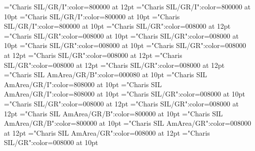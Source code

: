 \documentclass[a4paper,twoside]{article}
\begin{document}
\font\partofspeechmorphosyntaxanalysissensesensecontentsensesentryletDatadicBody="Charis SIL/GR/I":color=800000 at 12pt
\font\spanespartofspeechmorphosyntaxanalysissensesensecontentsensesentryletDatadicBody="Charis SIL/GR/I":color=800000 at 10pt
\font\spanspanespartofspeechmorphosyntaxanalysissensesensecontentsensesentryletDatadicBody="Charis SIL/GR/I":color=800000 at 10pt
\font\spanpartofspeechmorphosyntaxanalysissensesensecontentsensesentryletDatadicBody="Charis SIL/GR/I":color=800000 at 10pt
\font{}="Charis SIL/GR":color=008000 at 12pt
\font\spanesdefinitionsensesensecontentsensesentryletDatadicBody="Charis SIL/GR":color=008000 at 10pt
\font\spanspanesdefinitionsensesensecontentsensesentryletDatadicBody="Charis SIL/GR":color=008000 at 10pt
\font\spandefinitionsensesensecontentsensesentryletDatadicBody="Charis SIL/GR":color=008000 at 10pt
\font\pictureentryletDatadicBody="Charis SIL/GR":color=008000 at 12pt
\font\thumbnailpictureentryletDatadicBody="Charis SIL/GR":color=008000 at 12pt
\font\captionContentpictureentryletDatadicBody="Charis SIL/GR":color=008000 at 12pt
\font\captioncaptionContentpictureentryletDatadicBody="Charis SIL/GR":color=008000 at 12pt
\font\spanmxbcaptioncaptionContentpictureentryletDatadicBody="Charis SIL AmArea/GR/B":color=000080 at 10pt
\font\comentariorestrictivosensesensecontentsensesentryletDatadicBody="Charis SIL AmArea/GR/I":color=808000 at 10pt
\font\spancomentariorestrictivosensesensecontentsensesentryletDatadicBody="Charis SIL AmArea/GR/I":color=808000 at 10pt
\font\spanescomentariorestrictivosensesensecontentsensesentryletDatadicBody="Charis SIL/GR":color=008000 at 10pt
\font\mainentrysubsensessensessensesensecontentsensesentryletDatadicBody="Charis SIL/GR":color=008000 at 12pt
\font\sensecontentmainentrysubsensessensessensesensecontentsensesentryletDatadicBody="Charis SIL/GR":color=008000 at 12pt
\font\sensenumbersensecontentmainentrysubsensessensessensesensecontentsensesentryletDatadicBody="Charis SIL AmArea/GR/B":color=800000 at 10pt
\font\spansensenumbersensecontentmainentrysubsensessensessensesensecontentsensesentryletDatadicBody="Charis SIL AmArea/GR/B":color=800000 at 10pt
\font\mainentrysubsensesensesensecontentmainentrysubsensessensessensesensecontentsensesentryletDatadicBody="Charis SIL AmArea/GR":color=008000 at 12pt
\font{}="Charis SIL AmArea/GR":color=008000 at 12pt
\font\spanesdefinitionorglossmainentrysubsensesensesensecontentmainentrysubsensessensessensesensecontentsensesentryletDatadicBody="Charis SIL/GR":color=008000 at 10pt
\end{document}
